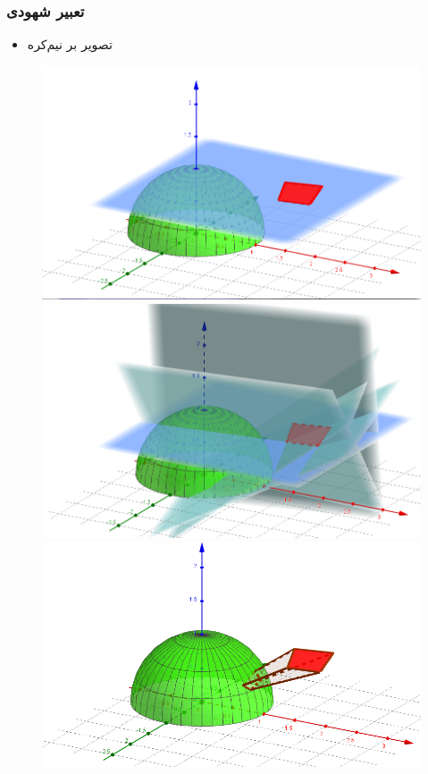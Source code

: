 \begin{frame}
\frametitle{تعبیر شهودی}
\begin{itemize}
\item{تصویر بر نیم‌کره}
\end{itemize}
\begin{figure}
    \begin{overprint}
    \includegraphics[scale=0.4]{Images/HPfig1.png}
    \includegraphics[scale=0.4]{Images/HPfig2.png}
    \includegraphics[scale=0.4]{Images/HPfig3.png}
    \end{overprint}
\end{figure}
\end{frame}
